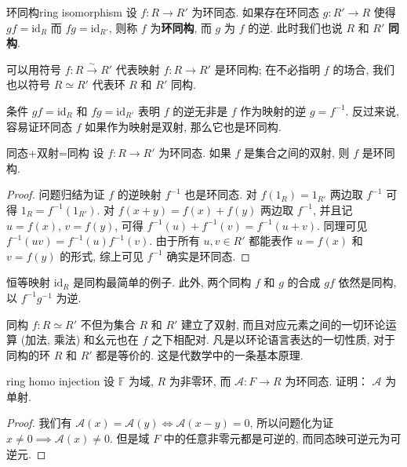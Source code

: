 \documentclass[12pt, a4paper]{ctexart}
\begin{document}
\begin{definition}{环同构}{ring isomorphism}
	设 $f : R \rightarrow R'$ 为环同态. 如果存在环同态 $g : R' \rightarrow R$ 使得 $gf = \text{id}_R$ 而 $fg = \text{id}_{R'}$, 则称 $f$ 为\textbf{环同构}, 而 $g$ 为 $f$ 的逆. 此时我们也说 $R$ 和 $R'$ \textbf{同构}.
	
	可以用符号 $f : R \xrightarrow{\sim} R'$ 代表映射 $f : R \rightarrow R'$ 是环同构; 在不必指明 $f$ 的场合, 我们也以符号 $R \simeq R'$ 代表环 $R$ 和 $R'$ 同构.
\end{definition}
条件 $gf = \text{id}_R$ 和 $fg = \text{id}_{R'}$ 表明 $f$ 的逆无非是 $f$ 作为映射的逆 $g = f^{-1}$. 反过来说, 容易证环同态 $f$ 如果作为映射是双射, 那么它也是环同构.
\begin{proposition}{同态+双射=同构}{}
	设 $f : R \rightarrow R'$ 为环同态. 如果 $f$ 是集合之间的双射, 则 $f$ 是环同构.
\end{proposition}
\begin{proof}
	问题归结为证 $f$ 的逆映射 $f^{-1}$ 也是环同态. 对 $f(1_R) = 1_{R'}$ 两边取 $f^{-1}$ 可得 $1_R = f^{-1}(1_{R'})$. 对 $f(x + y) = f(x) + f(y)$ 两边取 $f^{-1}$, 并且记 $u = f(x)$, $v = f(y)$, 可得 $f^{-1}(u) + f^{-1}(v) = f^{-1}(u + v)$. 同理可见 $f^{-1}(uv) = f^{-1}(u)f^{-1}(v)$. 由于所有 $u, v \in R'$ 都能表作 $u = f(x)$ 和 $v = f(y)$ 的形式, 综上可见 $f^{-1}$ 确实是环同态.
\end{proof}
恒等映射 $\text{id}_R$ 是同构最简单的例子. 此外, 两个同构 $f$ 和 $g$ 的合成 $gf$ 依然是同构, 以 $f^{-1}g^{-1}$ 为逆.

同构 $f : R \simeq R'$ 不但为集合 $R$ 和 $R'$ 建立了双射, 而且对应元素之间的一切环论运算 (加法, 乘法) 和幺元也在 $f$ 之下相配对. 凡是以环论语言表达的一切性质, 对于同构的环 $R$ 和 $R'$ 都是等价的. 这是代数学中的一条基本原理.
\begin{proposition}{}{ring homo injection}
	设 $\mathbb F$ 为域, $R$ 为非零环, 而 $\mathcal A : F \rightarrow R$ 为环同态. 证明： $\mathcal A$ 为单射.
\end{proposition}
\begin{proof}
	我们有 $\mathcal A(x) = \mathcal A(y) \iff \mathcal A(x - y) = 0$, 所以问题化为证 $x \neq 0 \implies \mathcal A(x) \neq 0$. 但是域 $F$ 中的任意非零元都是可逆的, 而同态映可逆元为可逆元.
\end{proof}
\end{document}
